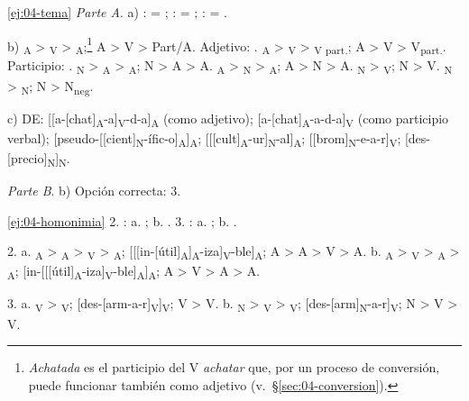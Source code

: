 \begin{solucion}{\ref{ej:04-tema}}
\textit{Parte A}. a) :  = ; :  = ;
:  = .

b) \textsubscript{A} > \textsubscript{V} >
\textsubscript{A};\footnote{\textit{Achatada} es el participio
del V \textit{achatar} que, por un proceso de conversión, puede funcionar
también como adjetivo (v.~§\ref{sec:04-conversion}).} A > V > Part/A. Adjetivo:
. \textsubscript{A} >
\textsubscript{V} > \textsubscript{V part.}; A
> V > V\textsubscript{part.}. Participio: . \textsubscript{N} >
\textsubscript{A} >
\textsubscript{A}; N > A > A.
\textsubscript{A} > \textsubscript{N} >
\textsubscript{A}; A > N > A.
\textsubscript{N} > \textsubscript{V}; N > V.
\textsubscript{N} > \textsubscript{N}; N >
N\textsubscript{neg}.

c) DE:
[[a-[chat]\textsubscript{A}-a]\textsubscript{V}-d-a]\textsubscript{A} (como
adjetivo); [a-[chat]\textsubscript{A}-a-d-a]\textsubscript{V} (como participio
verbal);
[pseudo-[[cient]\textsubscript{N}-ífic-o]\textsubscript{A}]\textsubscript{A};
[[[cult]\textsubscript{A}-ur]\textsubscript{N}-al]\textsubscript{A};
[[brom]\textsubscript{N}-e-a-r]\textsubscript{V};
[des-[precio]\textsubscript{N}]\textsubscript{N}.

\textit{Parte B}. b) Opción correcta: 3.
\end{solucion}

\begin{solucion}{\ref{ej:04-homonimia}}
2. : a. ; b. . 3. : a. ; b. .

2. a. \textsubscript{A} > \textsubscript{A} >
\textsubscript{V} > \textsubscript{A};
[[[in-[útil]\textsubscript{A}]\textsubscript{A}-iza]\textsubscript{V}-ble]\textsubscript{A};
A > A > V > A. b. \textsubscript{A} >
\textsubscript{V} > \textsubscript{A} >
\textsubscript{A};
[in-[[[útil]\textsubscript{A}-iza]\textsubscript{V}-ble]\textsubscript{A}]\textsubscript{A};
A > V > A > A.

3. a. \textsubscript{V} > \textsubscript{V};
[des-[arm-a-r]\textsubscript{V}]\textsubscript{V}; V > V. b.
\textsubscript{N} > \textsubscript{V} >
\textsubscript{V}; [des-[arm]\textsubscript{N}-a-r]\textsubscript{V};
N > V > V.
\end{solucion}


